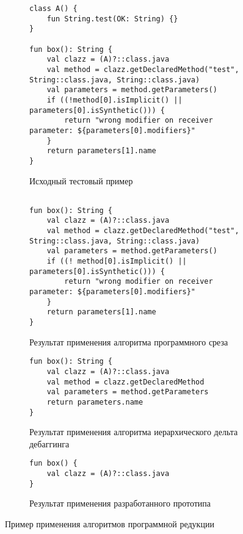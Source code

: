 \begin{figure}

\begin{subfigure}[t]{\linewidth}
\begin{lstlisting}
class A() {
    fun String.test(OK: String) {}
}

fun box(): String {
    val clazz = (A)?::class.java
    val method = clazz.getDeclaredMethod("test", String::class.java, String::class.java)
    val parameters = method.getParameters()
    if ((!method[0].isImplicit() || parameters[0].isSynthetic())) {
        return "wrong modifier on receiver parameter: ${parameters[0].modifiers}"
    }
    return parameters[1].name
}
\end{lstlisting}
\caption{Исходный тестовый пример}
\end{subfigure}

\begin{subfigure}[t]{\linewidth}
\begin{lstlisting}

fun box(): String {
	val clazz = (A)?::class.java
	val method = clazz.getDeclaredMethod("test", String::class.java, String::class.java)
	val parameters = method.getParameters()
	if ((! method[0].isImplicit() || parameters[0].isSynthetic())) {
		return "wrong modifier on receiver parameter: ${parameters[0].modifiers}"
	}
	return parameters[1].name
}
\end{lstlisting}
\caption{Результат применения алгоритма программного среза}
\end{subfigure}

\begin{subfigure}[t]{\linewidth}
\begin{lstlisting}
fun box(): String {
	val clazz = (A)?::class.java
	val method = clazz.getDeclaredMethod
	val parameters = method.getParameters
	return parameters.name
}
\end{lstlisting}
\caption{Результат применения алгоритма иерархического дельта дебаггинга}
\end{subfigure}

\begin{subfigure}[t]{\linewidth}
\begin{lstlisting}
fun box() {
	val clazz = (A)?::class.java
}
\end{lstlisting}
\caption{Результат применения разработанного прототипа}
\end{subfigure}

\caption{\label{test:compare}Пример применения алгоритмов программной редукции}
\end{figure}

